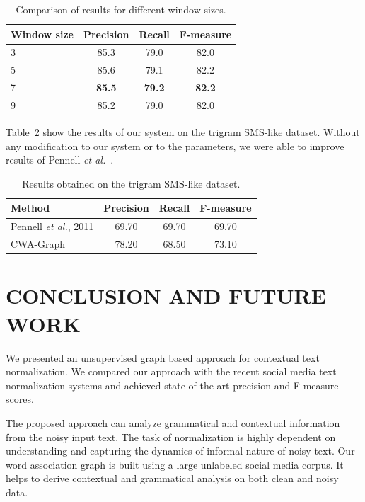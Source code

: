 \documentclass[a4paper,onesided,12pt]{report}
\begin{document}
\begin{table}[thb]
  \caption{Comparison of results for different window sizes.}
  \centering
  \begin{tabular}[th]{|l|c|c|c|}
    \hline
    \textbf{Window size} & \textbf{Precision} & \textbf{Recall} & \textbf{F-measure} \\
    \hline
    3 & 85.3 & 79.0 & 82.0 \\\hline
    5 & 85.6 & 79.1 & 82.2 \\\hline
    7 & \textbf{85.5} &  \textbf{79.2} &  \textbf{82.2} \\\hline
    9 & 85.2 & 79.0  & 82.0 \\\hline
  \end{tabular}
\label{tab:windows}
\end{table}

Table~\ref{tab:resultspennell} show the results of our system on the trigram SMS-like dataset. Without any modification to our system or to the parameters, we were able to improve results of Pennell \textit{et al.}~\cite{pennell2011character}.

\begin{table}[thb]
  \caption{Results obtained on the trigram SMS-like dataset.}
  \centering
  \begin{tabular}[t]{|l|c|c|c|}
    \hline
    \textbf{Method} & \textbf{Precision} & \textbf{Recall} & \textbf{F-measure} \\
    \hline
    Pennell \textit{et al.}, 2011 & 69.70 & 69.70 & 69.70 \\\hline
    CWA-Graph   & 78.20 & 68.50 & 73.10 \\\hline
  \end{tabular}
  \label{tab:resultspennell}
\end{table}


\chapter{CONCLUSION AND FUTURE WORK}

We presented an unsupervised graph based approach for contextual text normalization. We compared our approach with the recent social media text normalization systems and achieved state-of-the-art precision and F-measure scores.

The proposed approach can analyze grammatical and contextual information from the noisy input text. The task of normalization is highly dependent on understanding and capturing the dynamics of informal nature of noisy text. Our word association graph is built using a large unlabeled social media corpus. It helps to derive contextual and grammatical analysis on both clean and noisy data.
\end{document}
